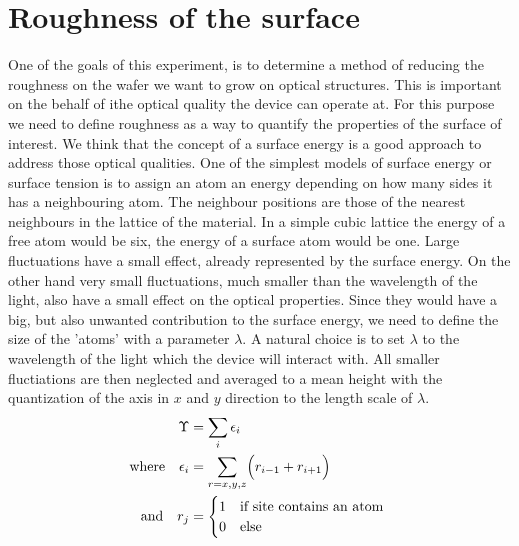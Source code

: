 \section{Roughness of the surface}

One of the goals of this experiment, is to determine a method of reducing the 
roughness on the wafer we want to grow on optical structures. This is important 
on the behalf of ithe optical quality the device can operate at.
For this purpose we need to define roughness as a way to quantify the properties 
of the surface of interest.
We think that the concept of a surface energy is a good approach to address 
those optical qualities. One of the simplest models of surface energy or surface 
tension  is to assign an atom an energy depending on how many sides it has a 
neighbouring atom. The neighbour positions are those of the nearest neighbours 
in the lattice of the material.  In a simple cubic lattice the energy of a free 
atom would be six, the energy of a surface atom would be one.
%
Large fluctuations have a small effect, already represented by the surface 
energy. On the other hand very small fluctuations, much smaller than the 
wavelength of the light, also have a small effect on the optical properties.  
Since they would have a big, but also unwanted contribution to the surface 
energy, we need to define the size of the 'atoms' with a parameter $\lambda$.
A natural choice is to set $\lambda$ to the wavelength of the light which the 
device will interact with. All smaller fluctiations are then neglected and 
averaged to a mean height with the quantization of the axis in $x$ and $y$ 
direction to the length scale of $\lambda$.
\begin{align}
    \Upsilon &=  \sum_i \epsilon_i \hfill ~ \\
    \text{where} \quad 
    \epsilon_i &=  \sum_{r=x,y,z} \Bigl( r_{i-1} + r_{i+1} \Bigr) \\
    \text{and}  \quad 
    r_j &=    \begin{cases}
                1 &\mbox{if site contains an atom } \\
                0 &\mbox{else }
            \end{cases}
\end{align}
